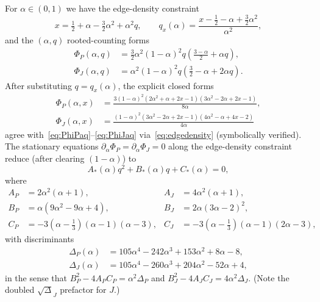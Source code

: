 \documentclass[11pt]{amsart}
\theoremstyle{definition}
\newcommand{\1}{\mathbf 1}
\begin{document}
For $\alpha\in(0,1)$ we have the edge-density constraint
\begin{equation}
\label{eq:edgedensity}
   x = \tfrac12 + \alpha - \tfrac32\alpha^2 + \alpha^2 q,
   \qquad
   q_x(\alpha) = \frac{x - \tfrac12 - \alpha + \tfrac32\alpha^2}{\alpha^2},
\end{equation}
and the $(\alpha,q)$ rooted-counting forms
\begin{align}
\Phi_P(\alpha, q) &= \tfrac32\alpha^2(1-\alpha)^2 q\!\left(\tfrac{3-\alpha}{2}+\alpha q\right),
\label{eq:PhiPaq}
\\
\Phi_J(\alpha, q) &= \alpha^2(1-\alpha)^2 q\!\left(\tfrac32-\alpha+2\alpha q\right).
\label{eq:PhiJaq}
\end{align}
After substituting $q = q_x(\alpha)$, the explicit closed forms
\begin{align}
\Phi_P(\alpha, x) &= \frac{3(1-\alpha)^2(2\alpha^2+\alpha+2x-1)(3\alpha^2-2\alpha+2x-1)}{8\alpha},
\label{eq:PhiPx}
\\
\Phi_J(\alpha, x) &= \frac{(1-\alpha)^2(3\alpha^2-2\alpha+2x-1)(4\alpha^2-\alpha+4x-2)}{4\alpha}
\label{eq:PhiJx}
\end{align}
agree with~\eqref{eq:PhiPaq}--\eqref{eq:PhiJaq} via~\eqref{eq:edgedensity}
(symbolically verified).  The stationary equations
$\partial_\alpha \Phi_P = \partial_\alpha\Phi_J = 0$ along the edge-density
constraint reduce (after clearing $(1-\alpha)$) to
\begin{equation}
\label{eq:statPJ}
   A_*(\alpha) q^2 + B_*(\alpha) q + C_*(\alpha) = 0,
\end{equation}
where
\begin{align*}
A_P &= 2\alpha^2(\alpha+1), &
A_J &= 4\alpha^2(\alpha+1),
\\
B_P &= \alpha(9\alpha^2-9\alpha+4), &
B_J &= 2\alpha(3\alpha-2)^2,
\\
C_P &= -3(\alpha-\tfrac13)(\alpha-1)(\alpha-3), &
C_J &= -3(\alpha-\tfrac13)(\alpha-1)(2\alpha-3),
\end{align*}
with discriminants
\begin{align}
\label{eq:DeltaP}
\Delta_P(\alpha) &= 105\alpha^4 - 242\alpha^3 + 153\alpha^2 + 8\alpha - 8,
\\
\label{eq:DeltaJ}
\Delta_J(\alpha) &= 105\alpha^4 - 260\alpha^3 + 204\alpha^2 - 52\alpha + 4,
\end{align}
in the sense that $B_P^2 - 4 A_P C_P = \alpha^2\Delta_P$ and
$B_J^2 - 4 A_J C_J = 4\alpha^2\Delta_J$.  (Note the doubled $\sqrt\Delta_J$
prefactor for $J$.)
\end{document}
